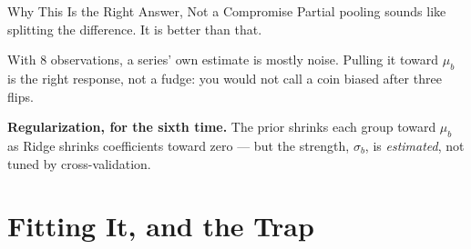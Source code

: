 \documentclass[aspectratio=169, 11pt]{beamer}
\begin{document}
\begin{frame}{Why This Is the Right Answer, Not a Compromise}
  Partial pooling sounds like splitting the difference. It is better than that.

  \vspace{0.15cm}
  With 8 observations, a series' own estimate is mostly noise. Pulling it toward $\mu_b$ is the
  right response, not a fudge: you would not call a coin biased after three flips.

  \begin{keybox}
    \textbf{Regularization, for the sixth time.} The prior shrinks each group toward $\mu_b$ as
    Ridge shrinks coefficients toward zero --- but the strength, $\sigma_b$, is \emph{estimated},
    not tuned by cross-validation.
  \end{keybox}

  \vspace{0.1cm}
\end{frame}

\section{Fitting It, and the Trap}

\end{document}
